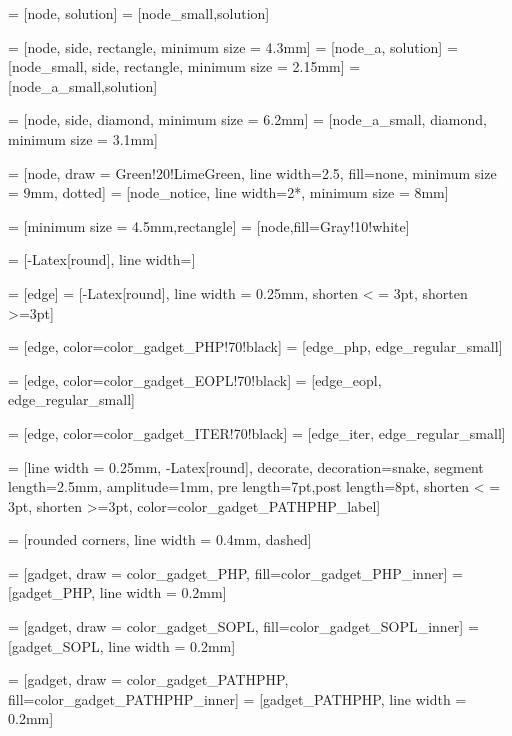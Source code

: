  = [node, solution]
 = [node_small,solution]

 = [node, side, rectangle, minimum size = 4.3mm]
 = [node_a, solution]
 = [node_small, side, rectangle, minimum size = 2.15mm]
 = [node_a_small,solution]

 = [node, side, diamond, minimum size = 6.2mm]
 = [node_a_small, diamond, minimum size = 3.1mm]

 = [node, draw = Green!20!LimeGreen, line width=2.5\nodeline, fill=none, minimum size = 9mm, dotted]
 = [node_notice, line width=2*\nodeline, minimum size = 8mm]

 = [minimum size = 4.5mm,rectangle]
 = [node,fill=Gray!10!white]


%
%
%
 = [-{Latex[round]}, line width=\arrowline]

 = [edge]
 = [-{Latex[round]}, line width = 0.25mm, shorten < = 3pt, shorten >=3pt]

 = [edge, color=color_gadget_PHP!70!black]
 = [edge_php, edge_regular_small]

 = [edge, color=color_gadget_EOPL!70!black]
 = [edge_eopl, edge_regular_small]

 = [edge, color=color_gadget_ITER!70!black]
 = [edge_iter, edge_regular_small]

 = [line width = 0.25mm, -{Latex[round]}, decorate, decoration={snake, segment length=2.5mm, amplitude=1mm, pre length=7pt,post length=8pt}, shorten < = 3pt, shorten >=3pt, color=color_gadget_PATHPHP_label]


%
%
%
 = [rounded corners, line width = 0.4mm, dashed]

 = [gadget, draw = color_gadget_PHP, fill=color_gadget_PHP_inner]
 = [gadget_PHP, line width = 0.2mm]

 = [gadget, draw = color_gadget_SOPL, fill=color_gadget_SOPL_inner]
 = [gadget_SOPL, line width = 0.2mm]

 = [gadget, draw = color_gadget_PATHPHP, fill=color_gadget_PATHPHP_inner]
 = [gadget_PATHPHP, line width = 0.2mm]

